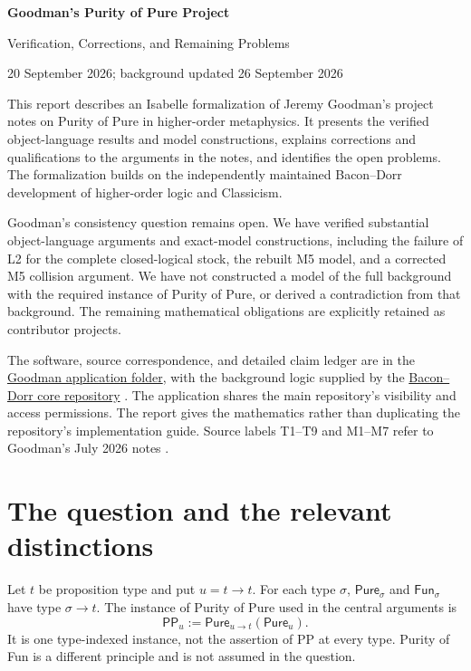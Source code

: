 \documentclass[12pt,leqno]{article}
\newcommand{\Pure}{\mathsf{Pure}}
\newcommand{\Fun}{\mathsf{Fun}}
\newcommand{\PP}{\mathsf{PP}}
\begin{document}
\begin{center}
{\Large\bfseries Goodman's Purity of Pure Project\par}
\vspace{4pt}
{\large Verification, Corrections, and Remaining Problems\par}
\vspace{6pt}
20 September 2026; background updated 26 September 2026
\end{center}

\noindent
This report describes an Isabelle formalization of Jeremy Goodman's
project notes on Purity of Pure in higher-order metaphysics. It presents
the verified object-language results and model constructions, explains
corrections and qualifications to the arguments in the notes, and identifies
the open problems. The formalization builds on the independently maintained
Bacon--Dorr development of higher-order logic and Classicism.

Goodman's consistency question remains open. We have verified substantial
object-language arguments and exact-model constructions, including the
failure of L2 for the complete closed-logical stock, the rebuilt M5 model,
and a corrected M5 collision argument. We have not constructed a model of
the full background with the required instance of Purity of Pure, or
derived a contradiction from that background. The remaining mathematical
obligations are explicitly retained as contributor projects.

The software, source correspondence, and detailed claim ledger are
in the \href{https://github.com/fitelson/hom-isabelle/tree/main/Applications/goodman-isabelle}{Goodman application folder},
with the background logic supplied by
the \href{https://github.com/fitelson/hom-isabelle}{Bacon--Dorr core repository}
\cite{book,classic}.
The application shares the main repository's visibility and access permissions.
The report gives the mathematics rather than duplicating
the repository's implementation guide. Source labels T1--T9 and M1--M7
refer to Goodman's July 2026 notes \cite{goodman}.

\section{The question and the relevant distinctions}

Let $t$ be proposition type and put $u=t\to t$. For each type $\sigma$,
$\Pure_\sigma$ and $\Fun_\sigma$ have type $\sigma\to t$. The instance of
Purity of Pure used in the central arguments is
\[
 \PP_u := \Pure_{u\to t}(\Pure_u).
\]
It is one type-indexed instance, not the assertion of PP at every type.
Purity of Fun is a different principle and is not assumed in the question.
\end{document}
